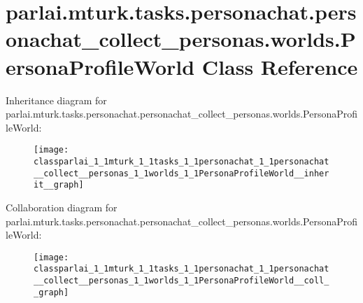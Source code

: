 \hypertarget{classparlai_1_1mturk_1_1tasks_1_1personachat_1_1personachat__collect__personas_1_1worlds_1_1PersonaProfileWorld}{}\section{parlai.\+mturk.\+tasks.\+personachat.\+personachat\+\_\+collect\+\_\+personas.\+worlds.\+Persona\+Profile\+World Class Reference}
\label{classparlai_1_1mturk_1_1tasks_1_1personachat_1_1personachat__collect__personas_1_1worlds_1_1PersonaProfileWorld}


Inheritance diagram for parlai.\+mturk.\+tasks.\+personachat.\+personachat\+\_\+collect\+\_\+personas.\+worlds.\+Persona\+Profile\+World\+:
\nopagebreak
\begin{figure}[H]
\begin{center}
\leavevmode
\texttt{[image: classparlai\_1\_1mturk\_1\_1tasks\_1\_1personachat\_1\_1personachat\_\_collect\_\_personas\_1\_1worlds\_1\_1PersonaProfileWorld\_\_inherit\_\_graph]}
\end{center}
\end{figure}


Collaboration diagram for parlai.\+mturk.\+tasks.\+personachat.\+personachat\+\_\+collect\+\_\+personas.\+worlds.\+Persona\+Profile\+World\+:
\nopagebreak
\begin{figure}[H]
\begin{center}
\leavevmode
\texttt{[image: classparlai\_1\_1mturk\_1\_1tasks\_1\_1personachat\_1\_1personachat\_\_collect\_\_personas\_1\_1worlds\_1\_1PersonaProfileWorld\_\_coll\_\_graph]}
\end{center}
\end{figure}
